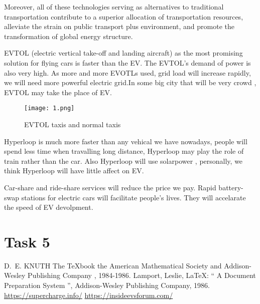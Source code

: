 \documentclass{mcmthesis}
\begin{document}
Moreover, all of these technologies serving as alternatives to traditional transportation contribute to a superior allocation of transportation resources, alleviate the strain on public transport plus environment, and promote the transformation of global energy structure.

EVTOL (electric vertical take-off and landing aircraft) as the most promising solution for flying cars is faster than the EV. The EVTOL's demand of power is also very high. As more and more EVOTLs used, grid load will increase rapidly, we will need more powerful electric grid.In some big city that will be very crowd , EVTOL may take the place of EV.

\begin{figure}[htbp]
\small
\centering
\texttt{[image: 1.png]}
\caption{EVTOL taxis and normal taxis} 
\end{figure}

Hyperloop is much more faster than any vehical we have nowadays, people will spend less time when travalling long distance, Hyperloop may play the role of train rather than the car. Also Hyperloop will use solarpower , personally, we think Hyperloop will have little affect on EV.

Car-share and ride-share services will reduce the price we pay. Rapid battery-swap stations for electric cars will facilitate people's lives. They will accelarate the speed of EV devolpment.

\section{Task 5 } 


\begin{thebibliography}{99}
 D.~E. KNUTH   The \TeX{}book  the American
Mathematical Society and Addison-Wesley
Publishing Company , 1984-1986.
Lamport, Leslie,  \LaTeX{}: `` A Document Preparation System '',
Addison-Wesley Publishing Company, 1986.
\url{https://supercharge.info/}
\url{https://insideevsforum.com/}
\end{thebibliography}
\end{document}
